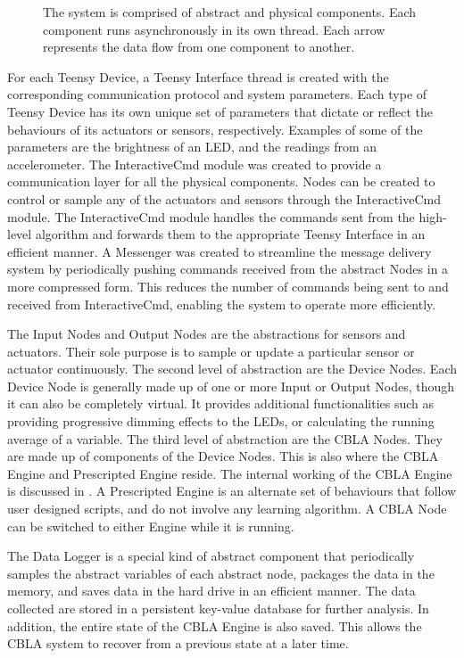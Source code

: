 \begin{figure} [!htbp]
	\caption[High-level system architecture]{The system is comprised of abstract and physical components. Each component runs asynchronously in its own thread. Each arrow represents the data flow from one component to another.}
	\label{fig:system-architecture}
\end{figure}

For each Teensy Device, a Teensy Interface thread is created with the corresponding communication protocol and system parameters. Each type of Teensy Device has its own unique set of parameters that dictate or reflect the behaviours of its actuators or sensors, respectively. Examples of some of the parameters are the brightness of an LED, and the readings from an accelerometer. The InteractiveCmd module was created to provide a communication layer for all the physical components. Nodes can be created to control or sample any of the actuators and sensors through the InteractiveCmd module. The InteractiveCmd module handles the commands sent from the high-level algorithm and forwards them to the appropriate Teensy Interface in an efficient manner. A Messenger was created to streamline the message delivery system by periodically pushing commands received from the abstract Nodes in a more compressed form. This reduces the number of commands being sent to and received from InteractiveCmd, enabling the system to operate more efficiently.

The Input Nodes and Output Nodes are the abstractions for sensors and actuators. Their sole purpose is to sample or update a particular sensor or actuator continuously. The second level of abstraction are the Device Nodes. Each Device Node is generally made up of one or more Input or Output Nodes, though it can also be completely virtual. It provides additional functionalities such as providing progressive dimming effects to the LEDs, or calculating the running average of a variable. The third level of abstraction are the CBLA Nodes. They are made up of components of the Device Nodes. This is also where the CBLA Engine and Prescripted Engine reside. The internal working of the CBLA Engine is discussed in . A Prescripted Engine is an alternate set of behaviours that follow user designed scripts, and do not involve any learning algorithm. A CBLA Node can be switched to either Engine while it is running. 

The Data Logger is a special kind of abstract component that periodically samples the abstract variables of each abstract node, packages the data in the memory, and saves data in the hard drive in an efficient manner. The data collected are stored in a persistent key-value database for further analysis. In addition, the entire state of the CBLA Engine is also saved. This allows the CBLA system to recover from a previous state at a later time.


